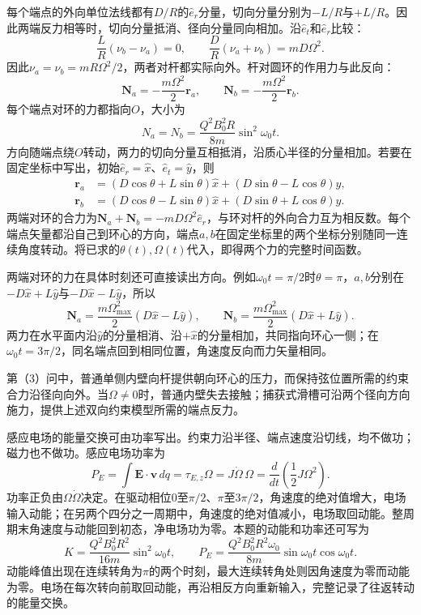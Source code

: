 \documentclass[UTF8,fontset=fandol,a4paper,11pt]{ctexart}
\begin{document}
每个端点的外向单位法线都有$D/R$的$\hat e_r$分量，切向分量分别为$-L/R$与$+L/R$。因此两端反力相等时，切向分量抵消、径向分量同向相加。沿$\hat e_t$和$\hat e_r$比较：
\[
\frac L R(\nu_b-\nu_a)=0,\qquad
\frac D R(\nu_a+\nu_b)=mD\Omega^2.
\]
因此$\nu_a=\nu_b=mR\Omega^2/2$，两者对杆都实际向外。杆对圆环的作用力与此反向：
\[
\boxed{\boldsymbol N_a=-\frac{m\Omega^2}{2}\boldsymbol r_a,\qquad
\boldsymbol N_b=-\frac{m\Omega^2}{2}\boldsymbol r_b}.
\]
每个端点对环的力都指向$O$，大小为
\[
\boxed{N_a=N_b=\frac{Q^2B_0^2R}{8m}\sin^2\omega_0t}.
\]
方向随端点绕$O$转动，两力的切向分量互相抵消，沿质心半径的分量相加。若要在固定坐标中写出，初始$\hat e_r=\hat x$、$\hat e_t=\hat y$，则
\[
\begin{aligned}
\boldsymbol r_a&=(D\cos\theta+L\sin\theta)\hat x
+(D\sin\theta-L\cos\theta)\hat y,\\
\boldsymbol r_b&=(D\cos\theta-L\sin\theta)\hat x
+(D\sin\theta+L\cos\theta)\hat y.
\end{aligned}
\]
两端对环的合力为$\boldsymbol N_a+\boldsymbol N_b=-mD\Omega^2\hat e_r$，与环对杆的外向合力互为相反数。每个端点矢量都沿自己到环心的方向，端点$a,b$在固定坐标里的两个坐标分别随同一连续角度转动。将已求的$\theta(t),\Omega(t)$代入，即得两个力的完整时间函数。

两端对环的力在具体时刻还可直接读出方向。例如$\omega_0t=\pi/2$时$\theta=\pi$，$a,b$分别在$-D\hat x+L\hat y$与$-D\hat x-L\hat y$，所以
\[
\boldsymbol N_a=\frac{m\Omega_{\max}^2}{2}(D\hat x-L\hat y),\qquad
\boldsymbol N_b=\frac{m\Omega_{\max}^2}{2}(D\hat x+L\hat y).
\]
两力在水平面内沿$\hat y$的分量相消、沿$+\hat x$的分量相加，共同指向环心一侧；在$\omega_0t=3\pi/2$，同名端点回到相同位置，角速度反向而力矢量相同。

第（3）问中，普通单侧内壁向杆提供朝向环心的压力，而保持弦位置所需的约束合力沿径向向外。当$\Omega\ne0$时，普通内壁失去接触；捕获式滑槽可沿两个径向方向施力，提供上述双向约束模型所需的端点反力。

感应电场的能量交换可由功率写出。约束力沿半径、端点速度沿切线，均不做功；磁力也不做功。感应电场功率为
\[
P_E=\int\boldsymbol E\cdot\boldsymbol v\,dq
=\tau_{E,z}\Omega
=J\dot\Omega\,\Omega
=\frac d{dt}\left(\frac12J\Omega^2\right).
\]
功率正负由$\Omega\dot\Omega$决定。在驱动相位$0$至$\pi/2$、$\pi$至$3\pi/2$，角速度的绝对值增大，电场输入动能；在另两个四分之一周期中，角速度的绝对值减小，电场取回动能。整周期末角速度与动能回到初态，净电场功为零。本题的动能和功率还可写为
\[
K=\frac{Q^2B_0^2R^2}{16m}\sin^2\omega_0t,\qquad
P_E=\frac{Q^2B_0^2R^2\omega_0}{8m}\sin\omega_0t\cos\omega_0t.
\]
动能峰值出现在连续转角为$\pi$的两个时刻，最大连续转角处则因角速度为零而动能为零。电场在每次转向前取回动能，再沿相反方向重新输入，完整记录了往返转动的能量交换。
\end{document}
